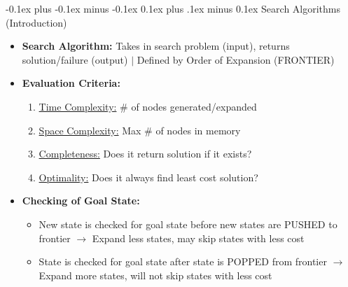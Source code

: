 \documentclass[landscape]{article}
\makeatletter
\renewcommand{\subsection}{\@startsection{subsection}{2}{0mm}%
  {-0.1ex plus -0.1ex minus -0.1ex}%
  {0.1ex plus .1ex minus 0.1ex}%
{\normalfont\scriptsize\bfseries}}
\makeatother
\begin{document}
\begin{multicols*}{5}
    \subsection{Search Algorithms (Introduction)}
    \begin{itemize}
      \item \textbf{Search Algorithm:} Takes in search problem (input), returns solution/failure (output) $\vert$ Defined by Order of Expansion (FRONTIER)
      \item \textbf{Evaluation Criteria:}
      \begin{enumerate}
        \item \underline{Time Complexity:} \# of nodes generated/expanded
        \item \underline{Space Complexity:} Max \# of nodes in memory
        \item \underline{Completeness:} Does it return solution if it exists?
        \item \underline{Optimality:} Does it always find least cost solution?
      \end{enumerate}
      \item \textbf{Checking of Goal State:}
      \begin{itemize}
        \item New state is checked for goal state before new states are PUSHED to frontier $\rightarrow$ Expand less states, may skip states with less cost
        \item State is checked for goal state after state is POPPED from frontier $\rightarrow$ Expand more states, will not skip states with less cost
      \end{itemize}
    \end{itemize}


\end{multicols*}
\end{document}
